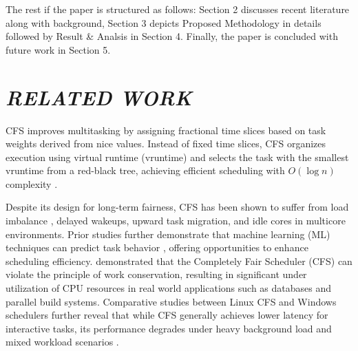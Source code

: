 \documentclass{llncs}
\begin{document}
The rest if the paper is structured as follows: Section 2 discusses recent literature along with background, Section 3 depicts Proposed Methodology in details followed by Result \& Analsis in Section 4. Finally, the paper is concluded with future work in Section 5. 




\section{\textit{RELATED WORK}}

CFS improves multitasking by assigning fractional time slices based on task weights derived from nice values. Instead of fixed time slices, CFS organizes execution using virtual runtime (vruntime) and selects the task with the smallest vruntime from a red-black tree, achieving efficient scheduling with $O(\log n)$ complexity \cite{harichane2022kubesc}. 

Despite its design for long-term fairness, CFS has been shown to suffer from load imbalance \cite{hayat2023machine}, delayed wakeups, upward task migration, and idle cores in multicore environments. Prior studies further demonstrate that machine learning (ML) techniques can predict task behavior \cite{MLEngineCFS2022}, offering opportunities to enhance scheduling efficiency. \cite{Lozi2016WastedCores} demonstrated that the Completely Fair Scheduler (CFS) can violate the principle of work conservation, resulting in significant under utilization of CPU resources in real world applications such as databases and parallel build systems. Comparative studies between Linux CFS and Windows schedulers further reveal that while CFS generally achieves lower latency for interactive tasks, its performance degrades under heavy background load and mixed workload scenarios \cite{LinuxCFSvsWindows2020}. 
\end{document}
